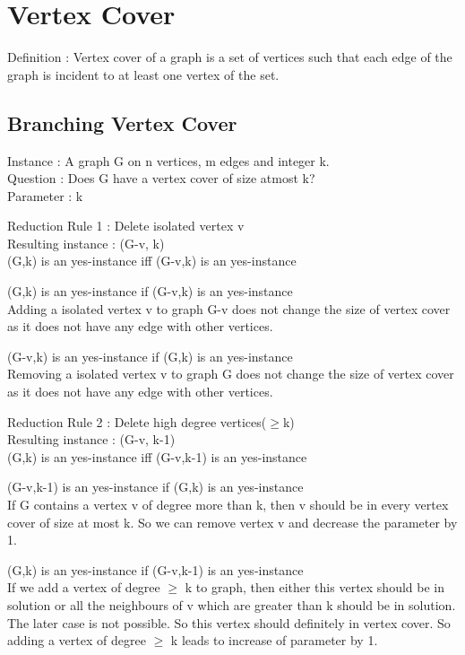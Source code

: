 \chapter{Vertex Cover}

Definition : Vertex cover of a graph is a set of vertices 
such that each edge of the graph is incident to at least one vertex of the set.

\section{Branching Vertex Cover}
Instance : A graph G on n vertices, m edges and integer k. \\
Question : Does G have a vertex cover of size atmost k? \\
Parameter : k

Reduction Rule 1 : Delete isolated vertex v \\
Resulting instance : (G-v, k) \\
(G,k) is an yes-instance iff (G-v,k) is an yes-instance

(G,k) is an yes-instance if (G-v,k) is an yes-instance \\
Adding a isolated vertex v to graph G-v does not change the size of vertex cover as 
it does not have any edge with other vertices.

(G-v,k) is an yes-instance if (G,k) is an yes-instance \\
Removing a isolated vertex v to graph G does not change the size of vertex cover as 
it does not have any edge with other vertices.

Reduction Rule 2 : Delete high degree vertices($\geq$k) \\
Resulting instance : (G-v, k-1) \\
(G,k) is an yes-instance iff (G-v,k-1) is an yes-instance 

(G-v,k-1) is an yes-instance if (G,k) is an yes-instance \\
If G contains a vertex v of degree more than k, then v should be in
every vertex cover of size at most k. So we can remove vertex v and decrease the parameter by 1.

(G,k) is an yes-instance if (G-v,k-1) is an yes-instance \\
If we add a vertex of degree $\geq$ k to graph, then either this vertex should be in solution 
or all the neighbours of v which are greater than k should be in solution. The later case is not
possible. So this vertex should definitely in vertex cover. So adding a vertex of degree $\geq$ k leads
to increase of parameter by 1. 

